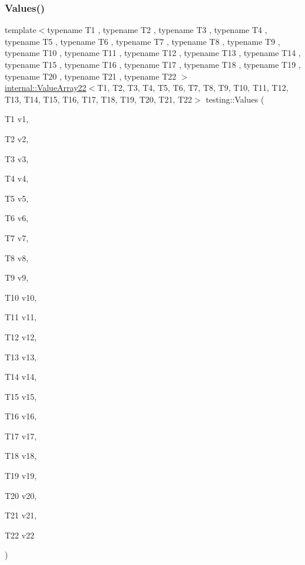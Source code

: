 \subsubsection{\texorpdfstring{Values()}{Values()}\hspace{0.1cm}{\footnotesize\ttfamily [23/51]}}
{\footnotesize\ttfamily template$<$typename T1 , typename T2 , typename T3 , typename T4 , typename T5 , typename T6 , typename T7 , typename T8 , typename T9 , typename T10 , typename T11 , typename T12 , typename T13 , typename T14 , typename T15 , typename T16 , typename T17 , typename T18 , typename T19 , typename T20 , typename T21 , typename T22 $>$ \\
\mbox{\hyperlink{classtesting_1_1internal_1_1_value_array22}{internal\+::\+Value\+Array22}}$<$T1, T2, T3, T4, T5, T6, T7, T8, T9, T10, T11, T12, T13, T14, T15, T16, T17, T18, T19, T20, T21, T22$>$ testing\+::\+Values (\begin{DoxyParamCaption}\item[{T1}]{v1,  }\item[{T2}]{v2,  }\item[{T3}]{v3,  }\item[{T4}]{v4,  }\item[{T5}]{v5,  }\item[{T6}]{v6,  }\item[{T7}]{v7,  }\item[{T8}]{v8,  }\item[{T9}]{v9,  }\item[{T10}]{v10,  }\item[{T11}]{v11,  }\item[{T12}]{v12,  }\item[{T13}]{v13,  }\item[{T14}]{v14,  }\item[{T15}]{v15,  }\item[{T16}]{v16,  }\item[{T17}]{v17,  }\item[{T18}]{v18,  }\item[{T19}]{v19,  }\item[{T20}]{v20,  }\item[{T21}]{v21,  }\item[{T22}]{v22 }\end{DoxyParamCaption})}

\mbox{\label{namespacetesting_a820991f1c28518a0c218176bd7192de8}} 
